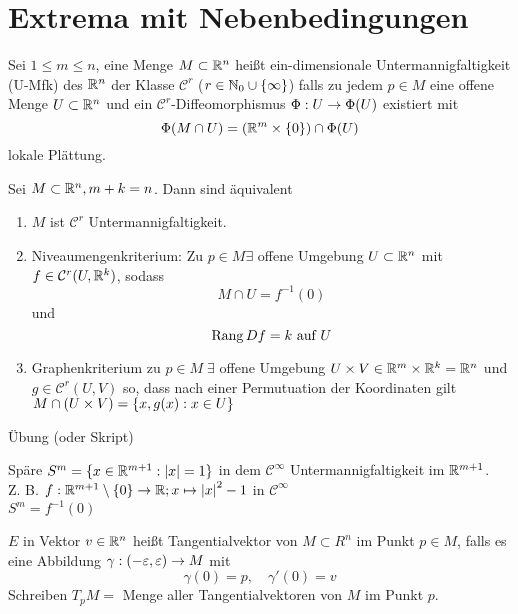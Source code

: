 \documentclass[../ana2.tex]{subfiles}
\begin{document}
\setcounter{section}{17}
\section{Extrema mit Nebenbedingungen}
\begin{defi}
    Sei \( 1 \leq m \leq n \), eine Menge \( M \subset \mathbb{R}^n \) 
    heißt ein-dimensionale Untermannigfaltigkeit 
    (U-Mfk) des \( \mathbb{R}^n \) der Klasse \( \mathcal{C}^r \) 
    (\(r \in \mathbb{N}_0 \cup \{\infty\} \)) falls zu jedem 
    \( p \in M \) eine offene Menge \( U \subset \mathbb{R}^n \) 
    und ein \( \mathcal{C}^r \)-Diffeomorphismus
    \(\Phi:U\rightarrow \Phi(U)\) existiert mit 
    \[ \Phi(M \cap U) = (\mathbb{R}^m \times \{0\}) \cap \Phi(U)\]
    lokale Plättung.
\end{defi}
\begin{satz}[Untermannigfaltigkeitskriterium]
    Sei \( M \subset \mathbb{R}^n, m + k = n \). Dann sind äquivalent
    \begin{enumerate}
        \item \(M\) ist \(\mathcal{C}^r \) Untermannigfaltigkeit.        
        \item Niveaumengenkriterium: Zu \( p \in M \exists \) offene 
        Umgebung \( U \subset \mathbb{R}^n \) mit 
        \( f \in \mathcal{C}^r(U, \mathbb{R}^k) \), sodass
        \[ M \cap U = f^{-1}(0) \]
        und
        \[ \operatorname{Rang} Df = k \text{ auf } U \]
        \item Graphenkriterium zu \(p \in M \; \exists \) offene
        Umgebung \(U \times V \in \mathbb{R}^m \times \mathbb{R}^k = \mathbb{R}^n\) und
        \(g \in \mathcal{C}^r (U, V)\) so, dass
        nach einer Permutuation der Koordinaten gilt \(M \cap (U \times V) 
        = \{x,g(x) : x \in U\}\)
    \end{enumerate}    
\end{satz}
\begin{bew}
    Übung (oder Skript)
\end{bew}
\begin{bsp}
    Späre \(S^m = \{x \in \mathbb{R}^{m+1}: \left|x\right| = 1\}\) in dem
    \(\mathcal{C}^\infty\) Untermannigfaltigkeit im \(\mathbb{R}^{m+1}\).\\
    Z. B. \(f:\mathbb{R}^{m+1} \setminus \{0\}\rightarrow \mathbb{R}; x \mapsto \left|x\right|^2 - 1 \) 
    in \(\mathcal{C}^\infty\)\\
    \( S^m = f^{-1}(0) \)
\end{bsp}
\begin{defi}
    \(E\) in Vektor \(v \in \mathbb{R}^n\) heißt Tangentialvektor von \(M \subset R^n\)
    im Punkt \(p \in M\), falls
    es eine Abbildung \( \gamma:(-\varepsilon, \varepsilon)\rightarrow M \) mit 
    \[ \gamma(0) = p, \quad \gamma'(0) = v \]
    Schreiben 
    \( T_p M = \) Menge aller Tangentialvektoren von \(M\) im Punkt \(p\).
\end{defi}
\end{document}

